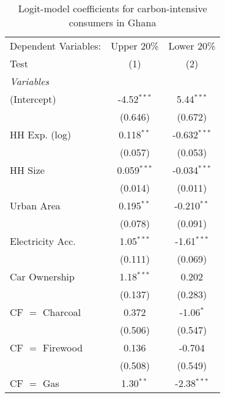 
\begin{table}[htbp!]
   \centering
   \small
   \begin{adjustbox}{width = 1\textwidth, max height = 0.95\textheight, center}
      \begin{threeparttable}[b]
         \caption{\label{tab:Logit_1_GHA} Logit-model coefficients for carbon-intensive consumers in Ghana}
         \begin{tabular}{lcc}
            \tabularnewline \midrule \midrule
            Dependent Variables: & Upper 20\%    & Lower 20\%\\   
            Test                 & (1)           & (2)\\  
            \midrule
            \emph{Variables}\\
            (Intercept)          & -4.52$^{***}$ & 5.44$^{***}$\\   
                                 & (0.646)       & (0.672)\\   
            HH Exp. (log)        & 0.118$^{**}$  & -0.632$^{***}$\\   
                                 & (0.057)       & (0.053)\\   
            HH Size              & 0.059$^{***}$ & -0.034$^{***}$\\   
                                 & (0.014)       & (0.011)\\   
            Urban Area           & 0.195$^{**}$  & -0.210$^{**}$\\   
                                 & (0.078)       & (0.091)\\   
            Electricity Acc.     & 1.05$^{***}$  & -1.61$^{***}$\\   
                                 & (0.111)       & (0.069)\\   
            Car Ownership        & 1.18$^{***}$  & 0.202\\   
                                 & (0.137)       & (0.283)\\   
            CF $=$ Charcoal      & 0.372         & -1.06$^{*}$\\   
                                 & (0.506)       & (0.547)\\   
            CF $=$ Firewood      & 0.136         & -0.704\\   
                                 & (0.508)       & (0.549)\\   
            CF $=$ Gas           & 1.30$^{**}$   & -2.38$^{***}$\\   

\end{tabular}
\end{threeparttable}
\end{adjustbox}
\end{table}
